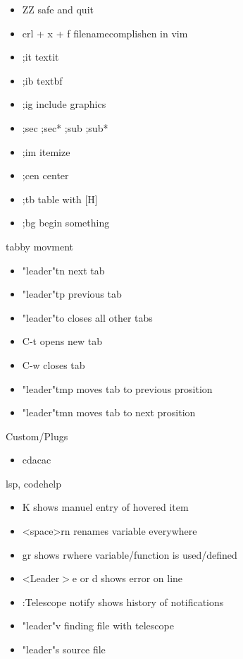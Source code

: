 \documentclass[12pt]{article}
\begin{document}
\begin{itemize}
    \item ZZ safe and quit
    \item crl + x + f filenamecomplishen in vim
    \item ;it textit{}
    \item ;ib textbf{}
    \item ;ig include graphics
    \item ;sec ;sec* ;sub ;sub*
    \item ;im itemize
    \item ;cen center
    \item ;tb table with [H]
    \item ;bg begin something
\end{itemize}

tabby movment 
\begin{itemize}
    \item "leader"tn next tab
    \item "leader"tp previous tab
    \item "leader"to closes all other tabs
    \item C-t opens new tab
    \item C-w closes tab 
    \item "leader"tmp moves tab to previous prosition
    \item "leader"tmn moves tab to next prosition
\end{itemize}

Custom/Plugs
\begin{itemize}

    \item  cdacac

\end{itemize}

lsp, codehelp
\begin{itemize}

    \item K shows manuel entry of hovered item
    \item <space>rn renames variable everywhere
    \item gr shows rwhere variable/function is used/defined
    \item <Leader$>$e or d shows error on line
    \item :Telescope notify shows history of notifications 
    \item "leader"v finding file with telescope
    \item "leader"s source file
\end{itemize}
\end{document}
